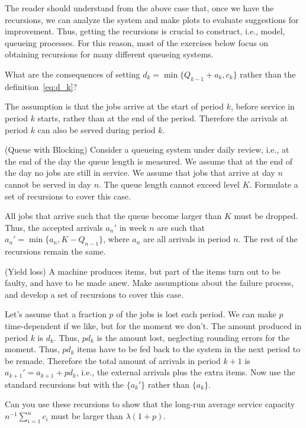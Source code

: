 The reader should understand from the above case that, once we have
the recursions, we can analyze the system and make plots to evaluate
suggestions for improvement.  Thus, getting the recursions is crucial
to construct, i.e., model, queueing processes. For this reason, most
of the exercises below focus on obtaining recursions for many
different queueing systems.

\begin{question}
 What are the consequences of setting
    $d_k = \min\{Q_{k-1}+a_k,  c_k\}$ rather than the definition~\eqref{eq:d_k}?
\begin{solution}
 The assumption is that the jobs arrive at the start of period
    $k$, before service in period $k$ starts, rather than at the end
    of the period. Therefore the arrivals at period $k$ can also be
    served during period $k$.
\end{solution}
\end{question}


\begin{question} (Queue with Blocking) Consider a queueing system
  under daily review, i.e., at the end of the day the queue length is
  measured. We assume that at the end of the day no jobs are still in
  service. We assume that jobs that arrive at day $n$ cannot be served
  in day $n$. The queue length cannot exceed level $K$.  Formulate a
  set of recursions to cover this case.
  \begin{solution}

    All jobs that arrive such that the queue become larger than $K$
    must be dropped. Thus, the accepted arrivals $a_n'$ in week $n$
    are such that $a_n' = \min\{a_n, K-Q_{n-1}\}$, where $a_n$ are all
    arrivals in period $n$.  The rest of the recursions remain the
    same.

  \end{solution}
\end{question}


\begin{question}
  (Yield loss) A machine produces items, but part of the items turn
  out to be faulty, and have to be made anew. Make assumptions about
  the failure process, and develop a set of recursions to cover this
  case.
  \begin{solution}
    Let's assume that a fraction $p$ of the jobs is lost each
    period. We can make $p$ time-dependent if we like, but for the
    moment we don't. The amount produced in period $k$ is $d_k$. Thus,
    $p d_k$ is the amount lost, neglecting rounding errors for the
    moment. Thus, $p d_k$ items have to be fed back to the system in
    the next period to be remade. Therefore the total amount of
    arrivals in period $k+1$ is $a_{k+1}'=a_{k+1}+pd_k$, i.e., the
    external arrivals plus the extra items. Now use the standard
    recursions but with the $\{a_{k}'\}$ rather than $\{a_k\}$. 

    Can you use these recursions to show that the long-run average
    service capacity $n^{-1}\sum_{i=1}^n c_i$ must be larger than
    $\lambda(1+p)$.
      \end{solution}
\end{question}

